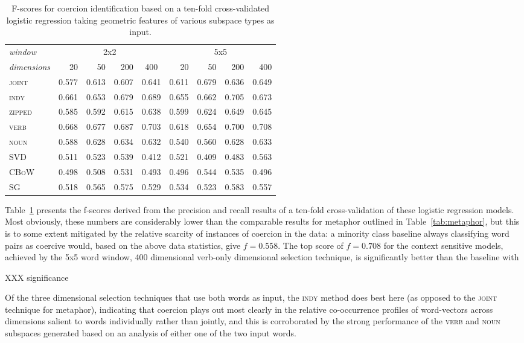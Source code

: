 \begin{table}
\centering
\begin{tabular}{lrrrr|rrrr}
\hline
\emph{window} & \multicolumn{4}{c}{2x2} & \multicolumn{4}{c}{5x5} \\
\emph{dimensions} & 20 & 50 & 200 & \multicolumn{1}{c}{400} & 20 & 50 & 200 & 400 \\
\hline
\textsc{joint} & 0.577 & 0.613 & 0.607 & 0.641 & 0.611 & 0.679 & 0.636 & 0.649 \\
\textsc{indy} & 0.661 & 0.653 & 0.679 & 0.689 & 0.655 & 0.662 & 0.705 & 0.673 \\
\textsc{zipped} & 0.585 & 0.592 & 0.615 & 0.638 & 0.599 & 0.624 & 0.649 & 0.645 \\
\textsc{verb} & 0.668 & 0.677 & 0.687 & 0.703 & 0.618 & 0.654 & 0.700 & 0.708 \\
\textsc{noun} & 0.588 & 0.628 & 0.634 & 0.632 & 0.540 & 0.560 & 0.628 & 0.633 \\
\textsc{SVD} & 0.511 & 0.523 & 0.539 & 0.412 & 0.521 & 0.409 & 0.483 & 0.563 \\
\textsc{CBoW} & 0.498 & 0.508 & 0.531 & 0.493 & 0.496 & 0.544 & 0.535 & 0.496 \\
\textsc{SG} & 0.518 & 0.565 & 0.575 & 0.529 & 0.534 & 0.523 & 0.583 & 0.557 \\
\hline
\end{tabular}
\caption[Context Sensitive and Static Model F-Scores for Coercion Classification]{F-scores for coercion identification based on a ten-fold cross-validated logistic regression taking geometric features of various subspace types as input.}
\label{tab:coercion}
\end{table}

Table~\ref{tab:coercion} presents the f-scores derived from the precision and recall results of a ten-fold cross-validation of these logistic regression models.  Most obviously, these numbers are considerably lower than the comparable results for metaphor outlined in Table~\ref{tab:metaphor}, but this is to some extent mitigated by the relative scarcity of instances of coercion in the data: a minority class baseline always classifying word pairs as coercive would, based on the above data statistics, give $f = 0.558$.  The top score of $f = 0.708$ for the context sensitive models, achieved by the 5x5 word window, 400 dimensional verb-only dimensional selection technique, is significantly better than the baseline with

XXX significance

Of the three dimensional selection techniques that use both words as input, the \textsc{indy} method does best here (as opposed to the \textsc{joint} technique for metaphor), indicating that coercion plays out most clearly in the relative co-occurrence profiles of word-vectors across dimensions salient to words individually rather than jointly, and this is corroborated by the strong performance of the \textsc{verb} and \textsc{noun} subspaces generated based on an analysis of either one of the two input words.


